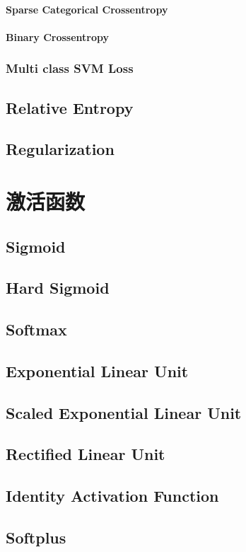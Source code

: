 \documentclass[oneside]{book}
\begin{document}
				\subsubsection{Sparse Categorical Crossentropy}
				\subsubsection{Binary Crossentropy}
			\subsection{Multi class SVM Loss}
		\section{Relative Entropy}
		\section{Regularization}

	\chapter{激活函数}
		\section{Sigmoid}
		\section{Hard Sigmoid}
		\section{Softmax}
		\section{Exponential Linear Unit}
		\section{Scaled Exponential Linear Unit}
		\section{Rectified Linear Unit}
		\section{Identity Activation Function}
		\section{Softplus}
\end{document}
